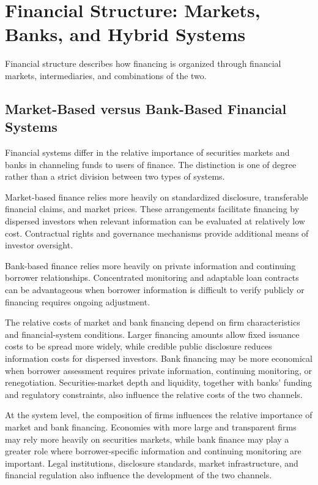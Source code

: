 \section{Financial Structure: Markets, Banks, and Hybrid Systems}

Financial structure describes how financing is organized through financial markets, intermediaries, and combinations of the two.

\subsection{Market-Based versus Bank-Based Financial Systems}

Financial systems differ in the relative importance of securities markets and banks in channeling funds to users of finance. The distinction is one of degree rather than a strict division between two types of systems.

Market-based finance relies more heavily on standardized disclosure, transferable financial claims, and market prices. These arrangements facilitate financing by dispersed investors when relevant information can be evaluated at relatively low cost. Contractual rights and governance mechanisms provide additional means of investor oversight.

Bank-based finance relies more heavily on private information and continuing borrower relationships. Concentrated monitoring and adaptable loan contracts can be advantageous when borrower information is difficult to verify publicly or financing requires ongoing adjustment.

The relative costs of market and bank financing depend on firm characteristics and financial-system conditions. Larger financing amounts allow fixed issuance costs to be spread more widely, while credible public disclosure reduces information costs for dispersed investors. Bank financing may be more economical when borrower assessment requires private information, continuing monitoring, or renegotiation. Securities-market depth and liquidity, together with banks' funding and regulatory constraints, also influence the relative costs of the two channels.

At the system level, the composition of firms influences the relative importance of market and bank financing. Economies with more large and transparent firms may rely more heavily on securities markets, while bank finance may play a greater role where borrower-specific information and continuing monitoring are important. Legal institutions, disclosure standards, market infrastructure, and financial regulation also influence the development of the two channels.


